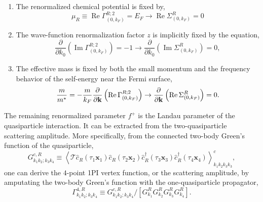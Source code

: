 \documentclass[reprint,amsmath,amssymb,aps,prb]{revtex4-1}
\begin{document}
\begin{enumerate}
    \item The renormalized chemical potential is fixed by,
          \begin{equation}
              \label{eq:condition1}
              \mu_R \equiv \operatorname{Re}\Gamma^{R;2}_{(0, k_F)} = E_F \rightarrow \operatorname{Re}\Sigma^{R}_{(0, k_F)} = 0
          \end{equation}

    \item The wave-function renormalization factor $z$ is implicitly fixed by the equation,
          \begin{equation}
              \label{eq:condition2}
              \frac{\partial }{\partial k_0}\left(\operatorname{Im} \Gamma^{R; 2}_{(0, k_F)}\right) = -1 \rightarrow \frac{\partial }{\partial k_0}\left(\operatorname{Im} \Sigma^{R}_{(0, k_F)}\right) = 0,
          \end{equation}
    \item The effective mass is fixed by both the small momentum and the frequency behavior of the self-energy near the Fermi surface,
          \begin{equation}
              \label{eq:condition3}
              \frac{m}{m^*}=-\frac{m}{k_F}\frac{\partial }{\partial \bold{k}}\left(\operatorname{Re}\Gamma^{R;2}_{(0, k_F)}\right) \rightarrow \frac{\partial }{\partial \bold{k}}\left(\operatorname{Re}\Sigma^{R}_{(0, k_F)}\right)=0.
          \end{equation}
\end{enumerate}

The remaining renormalized parameter $f^+$ is the Landau parameter of the quasiparticle interaction. It can be extracted from the two-quasiparticle scattering amplitude.
More specifically,  from the connected two-body Green's function of the quasiparticle,
\begin{equation}
    G^{c,R}_{k_1k_2; k_3k_4}\equiv \left< \mathcal{T} \hat{c}_R(\tau_1 \mathbf{x}_1)\hat{c}_R(\tau_2 \mathbf{x}_2) \hat{c}_R^\dag(\tau_3 \mathbf{x}_3)\hat{c}_R^\dag(\tau_4 \mathbf{x}_4) \right>^c_{k_1 k_2 k_3 k_3},
\end{equation}
one can derive the $4$-point 1PI vertex function, or the scattering amplitude, by amputating the two-body Green's function with the one-quasiparticle propagator,
\begin{equation}
    \Gamma^{4,R}_{k_1k_2;k_3k_4}\equiv G^{c,R}_{k_1k_2; k_3k_4}/\left[G^R_{k_1}G^R_{k_2}G^R_{k_3}G^R_{k_4}\right].
\end{equation}
\end{document}

